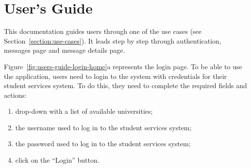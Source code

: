 \chapter{User's Guide}

This documentation guides users through one of the use cases (see Section~\ref{section:use-cases}). It leads step by step through authentication, messages page and message details page.

Figure~\ref{fig:users-guide-login-home}a represents the login page. To be able to use the application, users need to login to the system with credentials for their student services system. To do this, they need to complete the required fields and actions:

\begin{enumerate}
    \item drop-down with a list of available universities;
    \item the username used to log in to the student services system;
    \item the password used to log in to the student services system;
    \item click on the ``Login'' button.
\end{enumerate}

